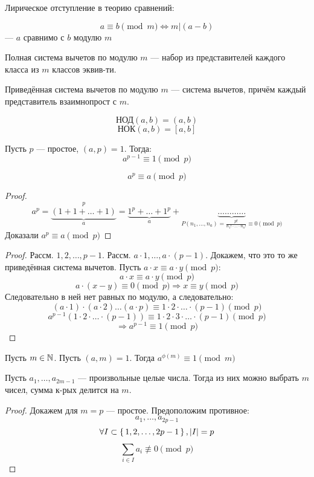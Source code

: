 Лирическое отступление в теорию сравнений:
\begin{definition}
\[
a \equiv b \pmod{m} \iff m | (a - b)
\]
--- $a$ сравнимо с $b$ модулю $m$
\end{definition}
\begin{definition}
Полная система вычетов по модулю $m$ --- набор из представителей каждого класса из $m$ классов эквив-ти.
\end{definition}
\begin{definition}
Приведённая система вычетов по модулю $m$ --- система вычетов, причём каждый представитель взаимнопрост с $m$.
\end{definition}
\begin{symb}
\[
\text{НОД}(a, b) = (a, b)
\]
\[
  \text{НОК}(a, b) = [a, b]
\]
\end{symb}
\begin{theorem}
\label{th:mlt_14}
Пусть $p$ --- простое, $(a, p) = 1$. Тогда:
\[
a^{p - 1} \equiv 1 \pmod p
\]
\end{theorem}
\begin{consequence}
\[
a^{p} \equiv a \pmod p
\]
\end{consequence}
\begin{proof}
\[
  a^{p} = \underbrace{(1 + 1 + \ldots + 1)}_{a}^{p} = \underbrace{1^{p} + \ldots + 1^{p}}_{a} + \underbrace{\ldots\ldots\ldots\ldots}_{P(n_1, \ldots, n_a) = \frac{p!}{n_1! \cdot \ldots \cdot n_a!} \equiv 0 \pmod p}
\]
Доказали $a^{p} \equiv a \pmod p$
\end{proof}
\begin{proof}
Рассм. $1, 2, \ldots, p - 1$. Рассм. $a \cdot 1, \ldots, a \cdot (p - 1)$. Докажем, что это то же приведённая система вычетов. Пусть $a \cdot x \equiv a \cdot y \pmod p$:
\[
a \cdot x \equiv a \cdot y \pmod p
\]
\[
  a \cdot (x - y) \equiv 0 \pmod p \Rightarrow x \equiv y \pmod p
\]
Следовательно в ней нет равных по модулю, а следовательно:
\[
  (a \cdot 1) \cdot (a \cdot 2) \ldots (a \cdot p) \equiv 1 \cdot 2 \cdot \ldots \cdot (p - 1) \pmod p
\]
\[
  a^{p - 1} (1 \cdot 2 \cdot \ldots \cdot (p - 1)) \equiv 1 \cdot 2 \cdot 3 \cdot \ldots \cdot (p - 1) \pmod p
\]
\[
\Rightarrow a^{p - 1} \equiv 1 \pmod p
\]
\end{proof}
\begin{theorem}[Эйлера]
\label{th:euler_14}
Пусть $m \in \mathbb{N}$. Пусть $(a, m) = 1$. Тогда $a^{\phi(m)} \equiv 1 \pmod m$
\end{theorem}
\begin{theorem}
\label{th:erdesh-ginsburg-ziva-14}
Пусть $a_1, \ldots, a_{2m - 1}$ --- произвольные целые числа. Тогда из них можно выбрать $m$ чисел, сумма к-рых делится на $m$.
\end{theorem}
\begin{proof}
Докажем для $m = p$ --- простое. Предоположим противное:
\[
a_1, \ldots, a_{2p - 1}
\]
\[
\forall I \subset \set{1, 2, \ldots, 2p - 1}, \left|I\right| = p
\]
\[
\sum_{i \in I}^{} a_i \not\equiv 0 \pmod p 
\]
\end{proof}
